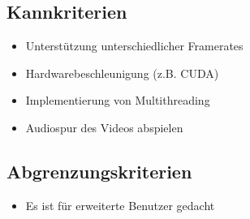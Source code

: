 \subsection{Kannkriterien}

\begin{itemize}
	\item Unterstützung unterschiedlicher Framerates 
	\item Hardwarebeschleunigung (z.B. CUDA)
	\item Implementierung von Multithreading
	\item Audiospur des Videos abspielen
\end{itemize}

\subsection{Abgrenzungskriterien}

\begin{itemize}
	\item Es ist für erweiterte Benutzer gedacht
\end{itemize}